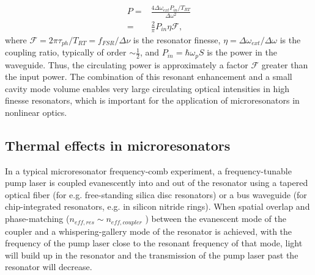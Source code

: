    \begin{align}
   P=&\frac{4\Delta\omega_{ext}P_{in}/T_{RT}}{\Delta\omega^2}\\
   =&\frac{2 }{\pi}P_{in}\eta\mathcal{F},
   \end{align}
   where $\mathcal{F}=2\pi\tau_{ph}/T_{RT}=f_{FSR}/\Delta\nu$ is the resonator finesse, $\eta=\Delta\omega_{ext}/\Delta\omega$ is the coupling ratio, typically of order $\sim\frac{1}{2}$, and $P_{in}=\hbar\omega_p S$ is the power in the waveguide. Thus, the circulating power is approximately a factor $\mathcal{F}$ greater than the input power. The combination of this resonant enhancement and a small cavity mode volume enables very large circulating optical intensities in high finesse resonators, which is important for the application of microresonators in nonlinear optics. 


\subsection{Thermal effects in microresonators} \label{sec:thermaleffects}


In a typical microresonator frequency-comb experiment, a frequency-tunable pump laser is coupled evanescently into and out of the resonator using a tapered optical fiber \cite{Knight1997,Spillane2003} (for e.g. free-standing silica disc resonators) or a bus waveguide (for chip-integrated resonators, e.g. in silicon nitride rings). When spatial overlap and phase-matching ($n_{eff,res}\sim n_{eff,coupler}$ \cite{ShahHosseini2010}) between the evanescent mode of the coupler and a whispering-gallery mode of the resonator is achieved, with the frequency of the pump laser close to the resonant frequency of that mode, light will build up in the resonator and the transmission of the pump laser past the resonator will decrease.

